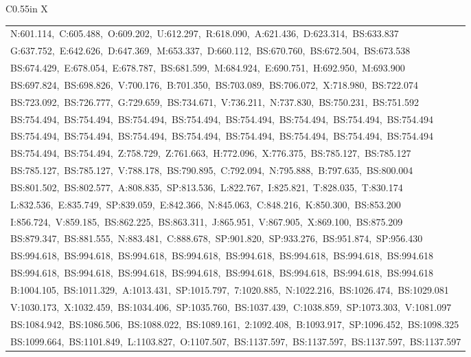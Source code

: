 \documentclass[10pt,a4paper]{article}
\begin{document}
\begin{center}
\begin{tabularx}{\textwidth}{
    C{0.55in}
    X
}
\begin{tabular}[t]{@{}l@{}}
N:601.114,\ C:605.488,\ O:609.202,\ U:612.297,\ R:618.090,\ A:621.436,\ D:623.314,\ BS:633.837\\
G:637.752,\ E:642.626,\ D:647.369,\ M:653.337,\ D:660.112,\ BS:670.760,\ BS:672.504,\ BS:673.538\\
BS:674.429,\ E:678.054,\ E:678.787,\ BS:681.599,\ M:684.924,\ E:690.751,\ H:692.950,\ M:693.900\\
BS:697.824,\ BS:698.826,\ V:700.176,\ B:701.350,\ BS:703.089,\ BS:706.072,\ X:718.980,\ BS:722.074\\
BS:723.092,\ BS:726.777,\ G:729.659,\ BS:734.671,\ V:736.211,\ N:737.830,\ BS:750.231,\ BS:751.592\\
BS:754.494,\ BS:754.494,\ BS:754.494,\ BS:754.494,\ BS:754.494,\ BS:754.494,\ BS:754.494,\ BS:754.494\\
BS:754.494,\ BS:754.494,\ BS:754.494,\ BS:754.494,\ BS:754.494,\ BS:754.494,\ BS:754.494,\ BS:754.494\\
BS:754.494,\ BS:754.494,\ Z:758.729,\ Z:761.663,\ H:772.096,\ X:776.375,\ BS:785.127,\ BS:785.127\\
BS:785.127,\ BS:785.127,\ V:788.178,\ BS:790.895,\ C:792.094,\ N:795.888,\ B:797.635,\ BS:800.004\\
BS:801.502,\ BS:802.577,\ A:808.835,\ SP:813.536,\ L:822.767,\ I:825.821,\ T:828.035,\ T:830.174\\
L:832.536,\ E:835.749,\ SP:839.059,\ E:842.366,\ N:845.063,\ C:848.216,\ K:850.300,\ BS:853.200\\
I:856.724,\ V:859.185,\ BS:862.225,\ BS:863.311,\ J:865.951,\ V:867.905,\ X:869.100,\ BS:875.209\\
BS:879.347,\ BS:881.555,\ N:883.481,\ C:888.678,\ SP:901.820,\ SP:933.276,\ BS:951.874,\ SP:956.430\\
BS:994.618,\ BS:994.618,\ BS:994.618,\ BS:994.618,\ BS:994.618,\ BS:994.618,\ BS:994.618,\ BS:994.618\\
BS:994.618,\ BS:994.618,\ BS:994.618,\ BS:994.618,\ BS:994.618,\ BS:994.618,\ BS:994.618,\ BS:994.618\\
B:1004.105,\ BS:1011.329,\ A:1013.431,\ SP:1015.797,\ 7:1020.885,\ N:1022.216,\ BS:1026.474,\ BS:1029.081\\
V:1030.173,\ X:1032.459,\ BS:1034.406,\ SP:1035.760,\ BS:1037.439,\ C:1038.859,\ SP:1073.303,\ V:1081.097\\
BS:1084.942,\ BS:1086.506,\ BS:1088.022,\ BS:1089.161,\ 2:1092.408,\ B:1093.917,\ SP:1096.452,\ BS:1098.325\\
BS:1099.664,\ BS:1101.849,\ L:1103.827,\ O:1107.507,\ BS:1137.597,\ BS:1137.597,\ BS:1137.597,\ BS:1137.597\\

\end{tabular}
\end{tabularx}
\end{center}
\end{document}
